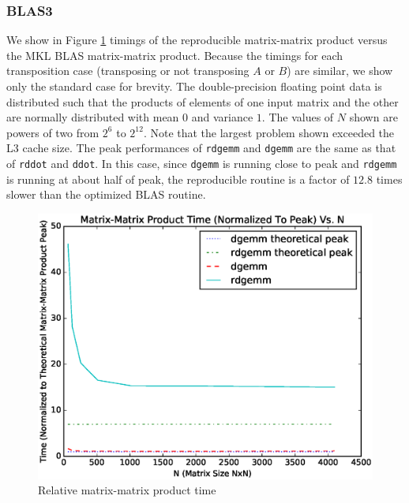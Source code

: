   \subsubsection{BLAS3}
    We show in Figure \ref{fig:gemm_timings} timings of the reproducible matrix-matrix product versus the MKL BLAS matrix-matrix product. Because the timings for each transposition case (transposing or not transposing $A$ or $B$) are similar, we show only the standard case for brevity. The double-precision floating point data is distributed such that the products of elements of one input matrix and the other are normally distributed with mean $0$ and variance $1$. The values of $N$ shown are powers of two from $2^6$ to $2^{12}$. Note that the largest problem shown exceeded the L3 cache size. The peak performances of \texttt{rdgemm} and \texttt{dgemm} are the same as that of \texttt{rddot} and \texttt{ddot}. In this case, since \texttt{dgemm} is running close to peak and \texttt{rdgemm} is running at about half of peak, the reproducible routine is a factor of $12.8$ times slower than the optimized BLAS routine.
  \begin{figure}[H]
  \begin{center}
  \includegraphics[width=\textwidth]{plots/gemm_comparison}
  \caption{Relative matrix-matrix product time}
  \label{fig:gemm_timings}
  \end{center}
  \end{figure}
